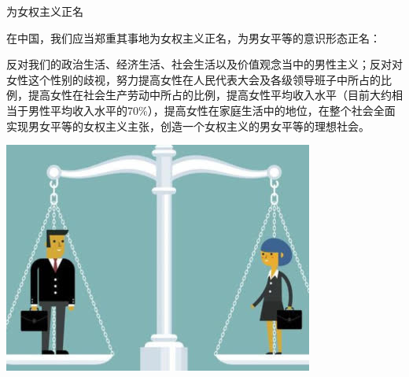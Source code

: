 \begin{frame}{为女权主义正名}
    \begin{block}{}
        在中国，我们应当郑重其事地为女权主义正名，为男女平等的意识形态正名：

        反对我们的政治生活、经济生活、社会生活以及价值观念当中的男性主义；反对对女性这个性别的歧视，努力提高女性在人民代表大会及各级领导班子中所占的比例，提高女性在社会生产劳动中所占的比例，提高女性平均收入水平（目前大约相当于男性平均收入水平的70\%），提高女性在家庭生活中的地位，在整个社会全面实现男女平等的女权主义主张，创造一个女权主义的男女平等的理想社会。
    \end{block}
    \begin{center}
        \includegraphics[width=.35\textwidth]{../docs/img/4-6.jpg}
    \end{center}
\end{frame}
